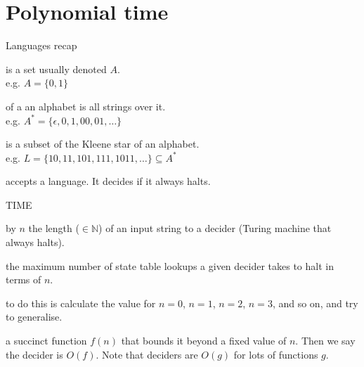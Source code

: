 \documentclass{beamer}
\begin{document}
\section{Polynomial time}

\begin{frame}{Languages recap}
  
  \begin{description}
    \setlength\itemsep{5mm}
    \item[Alphabet] is a set usually denoted \( A \). \\ e.g. \( A = \{ 0 , 1 \} \)
    \item[Kleene star] of a an alphabet is all strings over it. \\ e.g. \( A^* = \{ \epsilon, 0, 1, 00, 01, \ldots \} \)
    \item[Language] is a subset of the Kleene star of an alphabet. \\  e.g. \( L = \{ 10, 11, 101, 111, 1011, \ldots \} \subseteq A^* \)
    \item[Turing machine] accepts a language. It decides if it always halts.
  \end{description}

\end{frame}

\begin{frame}{TIME}
  

  \begin{description}
    \setlength\itemsep{2mm}
    \item[Denote] by \(n\) the length (\(\in \mathbb{N}\)) of an input string to a decider (Turing machine that always halts).
    \item[Calculate] the maximum number of state table lookups a given decider takes to halt in terms of \(n\).
    \item[One way] to do this is calculate the value for \(n=0\), \(n=1\), \(n=2\), \(n=3\), and so on, and try to generalise.
    \item[Find] a succinct function \(f(n)\) that bounds it beyond a fixed value of \(n\). Then we say the decider is \(O(f)\). Note that deciders are \(O(g)\) for lots of functions \(g\).
  \end{description}

\end{frame}
\end{document}
